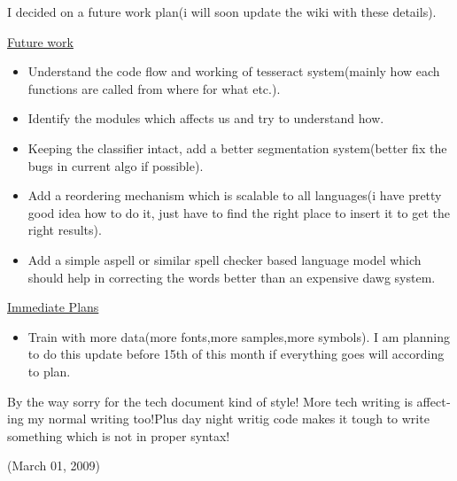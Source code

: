 \begin{english}
I decided on a future work plan(i will soon update the wiki with these details).

\underline{Future work}
\begin{itemize}
    \item Understand the code flow and working of tesseract system(mainly how each functions are called from where for what etc.).
    \item Identify the modules which affects us and try to understand how.
    \item Keeping the classifier intact, add a better segmentation system(better fix the bugs in current algo if possible).
    \item Add a reordering mechanism which is scalable to all languages(i have pretty good idea how to do it, just have to find the right place to insert it to get the right results).
    \item Add a simple aspell or similar spell checker based language model which should help in correcting the words better than an expensive dawg system.
\end{itemize}

\underline{Immediate Plans}
\begin{itemize}
    \item Train with more data(more fonts,more samples,more symbols). I am planning to do this update before 15th of this month if everything goes will according to plan.
\end{itemize}

By the way sorry for the tech document kind of style! More tech writing is affecting my normal writing too!Plus day night writig code makes it tough to write something which is not in proper syntax!
\begin{flushright}(March 01, 2009)\end{flushright}
\newpage 
\end{english}
